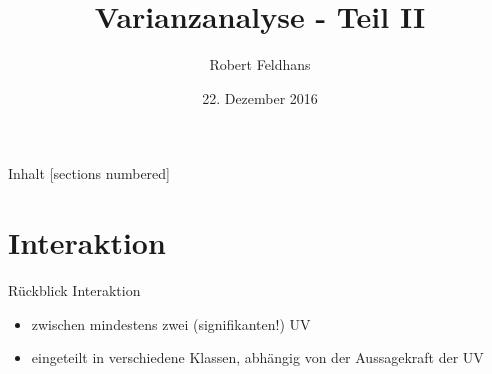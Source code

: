 \documentclass{beamer}
\title{Varianzanalyse - Teil II}
\date{22. Dezember 2016}
\author{Robert Feldhans}
\institute{Experimentelle Psychologie für Nichtpsychologen}
\begin{document}
	\maketitle
	
	\begin{frame}{Inhalt}
		[sections numbered]
		\tableofcontents[hideallsubsections]
	\end{frame}
	
	\section{Interaktion}
	
	\begin{frame}{Rückblick}
		Interaktion
		\begin{itemize}
			\item zwischen mindestens zwei (signifikanten!) UV
			\item eingeteilt in verschiedene Klassen, abhängig von der Aussagekraft der UV
		\end{itemize}
	\end{frame}	
	
\end{document}
